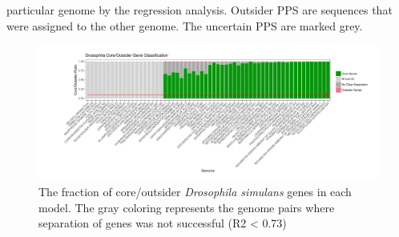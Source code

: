 particular genome by the regression analysis. Outsider PPS are sequences that were
assigned to the other genome. The uncertain PPS are marked grey.
\begin{center}
\begin{figure}
\includegraphics[width=12cm]{figures/core_outsider_barplot_bootstrapped.pdf}
\caption{The fraction of core/outsider \textit{Drosophila simulans} genes in
each model. The gray coloring represents the genome pairs where separation of genes was not successful (R2 <
0.73)}
\label{fig:rsquared_barplot}
\end{figure}
\end{center}

